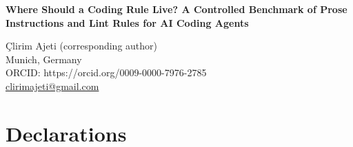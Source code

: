 \documentclass[11pt]{article}
\begin{document}
\begin{center}
{\Large\bfseries Where Should a Coding Rule Live? A Controlled Benchmark of Prose Instructions and Lint Rules for AI Coding Agents\par}
\bigskip
\c{C}lirim Ajeti (corresponding author)\\
Munich, Germany\\
ORCID: https://orcid.org/0009-0000-7976-2785\\
\href{mailto:clirimajeti@gmail.com}{clirimajeti@gmail.com}
\end{center}

\section*{Declarations}

\end{document}

